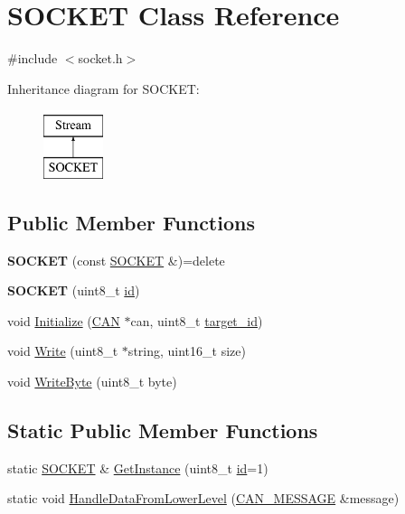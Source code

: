 \hypertarget{class_s_o_c_k_e_t}{}\section{S\+O\+C\+K\+ET Class Reference}
\label{class_s_o_c_k_e_t}


{\ttfamily \#include $<$socket.\+h$>$}

Inheritance diagram for S\+O\+C\+K\+ET\+:\begin{figure}[H]
\begin{center}
\leavevmode
\includegraphics[height=2.000000cm]{class_s_o_c_k_e_t}
\end{center}
\end{figure}
\subsection*{Public Member Functions}
\begin{DoxyCompactItemize}
\item 
\hypertarget{class_s_o_c_k_e_t_a354625580716401ca8444fd01b99e89e}{}\label{class_s_o_c_k_e_t_a354625580716401ca8444fd01b99e89e} 
{\bfseries S\+O\+C\+K\+ET} (const \hyperlink{class_s_o_c_k_e_t}{S\+O\+C\+K\+ET} \&)=delete
\item 
\hypertarget{class_s_o_c_k_e_t_ab87e109918e43ba097c153114f4f6494}{}\label{class_s_o_c_k_e_t_ab87e109918e43ba097c153114f4f6494} 
{\bfseries S\+O\+C\+K\+ET} (uint8\+\_\+t \hyperlink{class_s_o_c_k_e_t_a0755fe74751c2d94d3d1679cad9e6544}{id})
\item 
void \hyperlink{class_s_o_c_k_e_t_a883fe771ed7afbc3373d1a7a8bb363ba}{Initialize} (\hyperlink{class_c_a_n}{C\+AN} $\ast$can, uint8\+\_\+t \hyperlink{class_s_o_c_k_e_t_a566ef7ae1ca5366f622bbe805954a031}{target\+\_\+id})
\item 
void \hyperlink{class_s_o_c_k_e_t_ad8ee6b81c9f30267406412a95264abed}{Write} (uint8\+\_\+t $\ast$string, uint16\+\_\+t size)
\item 
void \hyperlink{class_s_o_c_k_e_t_abcddb460b7adf3595a813f08f3659356}{Write\+Byte} (uint8\+\_\+t byte)
\end{DoxyCompactItemize}
\subsection*{Static Public Member Functions}
\begin{DoxyCompactItemize}
\item 
static \hyperlink{class_s_o_c_k_e_t}{S\+O\+C\+K\+ET} \& \hyperlink{class_s_o_c_k_e_t_affb9b8540e07a471a1e48c0e4f595831}{Get\+Instance} (uint8\+\_\+t \hyperlink{class_s_o_c_k_e_t_a0755fe74751c2d94d3d1679cad9e6544}{id}=1)
\item 
static void \hyperlink{class_s_o_c_k_e_t_ab1345aded87c899fd525616b6f2cca4a}{Handle\+Data\+From\+Lower\+Level} (\hyperlink{struct_c_a_n___m_e_s_s_a_g_e}{C\+A\+N\+\_\+\+M\+E\+S\+S\+A\+GE} \&message)
\end{DoxyCompactItemize}
